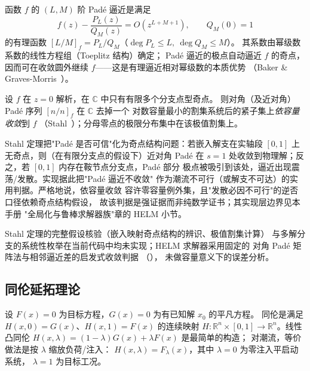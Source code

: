 \begin{definition}[Padé 逼近]\label{sec:pf-th-glob-def-pade}
函数 $f$ 的 $(L,M)$ 阶 Padé 逼近是满足
\begin{equation}
f(z)-\frac{P_L(z)}{Q_M(z)}=O(z^{L+M+1}),\qquad Q_M(0)=1
\end{equation}
的有理函数 $[L/M]_f=P_L/Q_M$（$\deg P_L\le L,\ \deg Q_M\le M$）。
其系数由幂级数系数的线性方程组（Toeplitz 结构）确定；
Padé 逼近的极点自动逼近 $f$ 的奇点，因而可在收敛圆外继续
$f$——这是有理逼近相对幂级数的本质优势
（Baker \& Graves-Morris~\cite{pfglob-baker}）。
\end{definition}

\begin{theorem}[Stahl 定理（陈述）]\label{sec:pf-th-glob-thm-stahl}
设 $f$ 在 $z=0$ 解析，在 $\mathbb C$ 中只有有限多个分支点型奇点。
则对角（及近对角）Padé 序列 $[n/n]_f$ 在 $\mathbb C$ 去掉一个
对数容量最小的割集系统后的紧子集上\emph{依容量收敛}到 $f$
（Stahl~\cite{pfglob-stahl}）；分母零点的极限分布集中在该极值割集上。
\end{theorem}

\begin{remark}\label{sec:pf-th-glob-rem-stahlops}
Stahl 定理把"Padé 是否可信"化为奇点结构问题：若嵌入解支在实轴段
$[0,1]$ 上无奇点，则（在有限分支点的假设下）近对角 Padé 在 $s=1$
处收敛到物理解；反之，若 $[0,1]$ 内存在鞍节点分支点，Padé 部分
极点被吸引到该处，逼近出现震荡/发散。实现据此把"Padé 逼近不收敛"
作为潮流不可行（或解支不可达）的实用判据。严格地说，依容量收敛
容许零容量例外集，且"发散必因不可行"的逆否口径依赖奇点结构假设，
故该判据是强证据而非纯数学证书；其实现层边界见本手册
"全局化与鲁棒求解器族"章的 HELM 小节。
\end{remark}

\begin{gapnote}
Stahl 定理的完整假设核验（嵌入映射奇点结构的辨识、极值割集计算）
与多解分支的系统性枚举在当前代码中均未实现；HELM 求解器采用固定的
对角 Padé 矩阵法与相邻逼近差的启发式收敛判据
（），
未做容量意义下的误差分析。
\end{gapnote}

\subsection{同伦延拓理论}\label{sec:pf-th-glob-homotopy}

\begin{definition}[同伦映射]\label{sec:pf-th-glob-def-homotopy}
设 $F(x)=0$ 为目标方程，$G(x)=0$ 为有已知解 $x_0$ 的平凡方程。
同伦是满足 $H(x,0)=G(x)$、$H(x,1)=F(x)$ 的连续映射
$H:\mathbb R^n\times[0,1]\to\mathbb R^n$。线性凸同伦
$H(x,\lambda)=(1-\lambda)G(x)+\lambda F(x)$ 是最简单的构造；
对潮流，等价做法是按 $\lambda$ 缩放负荷/注入：
$H(x,\lambda)=F_\lambda(x)$，其中 $\lambda=0$ 为零注入平启动系统，
$\lambda=1$ 为目标工况。
\end{definition}

